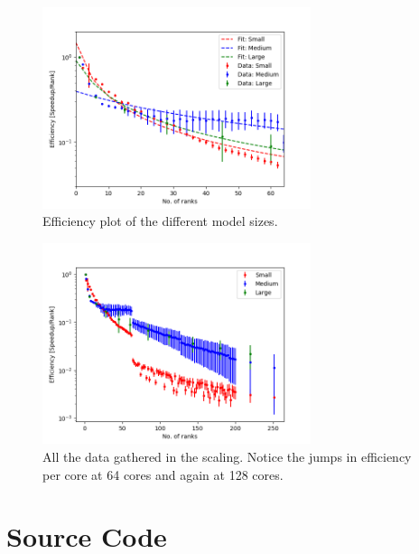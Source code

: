\documentclass{article}
\begin{document}
\begin{figure}
    \centering
    \includegraphics[width=0.7\textwidth]{Assignment_6_Flat_earth/Report/figures/Ahmdahls_law_fit.png}
    \caption{Efficiency plot of the different model sizes.}
    \label{fig:Efficiency_plot}
\end{figure}
\begin{figure}
    \centering
    \includegraphics[width=0.7\textwidth]{Assignment_6_Flat_earth/Report/figures/Efficiency_data.png}
    \caption{All the data gathered in the scaling. Notice the jumps in efficiency per core at 64 cores and again at 128 cores.}
    \label{fig:enter-label}
\end{figure}
\FloatBarrier
\newpage
\section{Source Code}
\label{sec:source}

\end{document}
